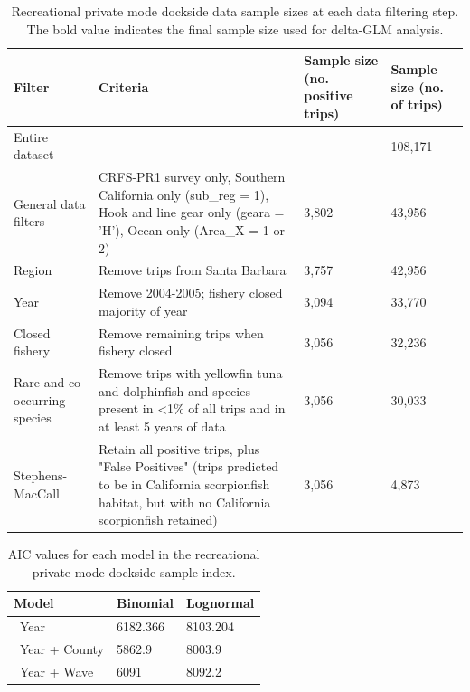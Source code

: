\documentclass[12pt,]{article}
\begin{document}
\FloatBarrier

\begin{table}[ht]
\centering
\caption{Recreational private mode dockside data sample 
                                          sizes at each data filtering step.  
                                          The bold value indicates the final sample size 
                                          used for delta-GLM analysis.} 
\label{tab:Fleet4_RecPR_dockside_filter}
\begin{tabular}{>{\raggedright}p{1.5in}>{\raggedright}p{2.6in}>{\raggedright}p{1in}>{\raggedright}p{1in}}
  \hline
Filter & Criteria & Sample size (no. positive trips) & Sample size (no. of trips) \\ 
  \hline
Entire dataset &  &  & 108,171 \\ 
  General data filters & CRFS-PR1 survey only, Southern California only (sub\_reg = 1), Hook and line gear only (geara = 'H'), Ocean only (Area\_X = 1 or 2) & 3,802 & 43,956 \\ 
  Region & Remove trips from Santa Barbara & 3,757 & 42,956 \\ 
  Year & Remove 2004-2005; fishery closed majority of year & 3,094 & 33,770 \\ 
  Closed fishery & Remove remaining trips when fishery closed & 3,056 & 32,236 \\ 
  Rare and co-occurring species & Remove trips with yellowfin tuna and dolphinfish and species present in <1\% of all trips and in at least 5 years of data & 3,056 & 30,033 \\ 
  Stephens-MacCall & Retain all positive trips, plus "False Positives" (trips predicted to be in California scorpionfish habitat, but with no California scorpionfish retained) & 3,056 & 4,873 \\ 
   \hline
\end{tabular}
\end{table}\begin{table}[ht]
\centering
\caption{AIC values for each model in the
                                          recreational private mode dockside sample 
                                          index.} 
\label{tab:Fleet4_RecPR_dockside_aic}
\begin{tabular}{lll}
  \hline
Model & Binomial & Lognormal \\ 
  \hline
~Year & 6182.366 & 8103.204 \\ 
  ~Year + County & 5862.9 & 8003.9 \\ 
  ~Year + Wave & 6091 & 8092.2 \\ 

\end{tabular}
\end{table}
\end{document}
